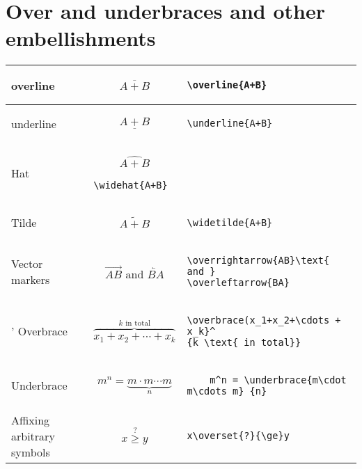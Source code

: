 \section{Over and underbraces and other embellishments}
\begin{longtable}{p{3cm} |p{5cm}| p{5cm}}\hline
    overline & 
\[
    \overline{A+B}
\]
&
\begin{verbatim}
\overline{A+B}
\end{verbatim} \\\hline
underline &
\[
\underline{A+B}
\] &
\begin{verbatim}
\underline{A+B}
\end{verbatim}
\\\hline
Hat &
\[
    \widehat{A+B}
\]
\begin{verbatim}
\widehat{A+B}
\end{verbatim}
\\\hline
Tilde&
\[
    \widetilde{A+B}
\]
&
\begin{verbatim}
\widetilde{A+B}
\end{verbatim}\\\hline
Vector markers &
\[
\overrightarrow{AB}\text{ and }
\overleftarrow{BA}
\] &
\begin{verbatim}
\overrightarrow{AB}\text{ and }
\overleftarrow{BA}
\end{verbatim}\\\hline'
Overbrace &
\[
\overbrace{x_1+x_2+\cdots + x_k}^
{k \text{ in total}}
\] &
\begin{verbatim}
\overbrace(x_1+x_2+\cdots + x_k}^
{k \text{ in total}}
\end{verbatim}
\\\hline
Underbrace &
\[
    m^n = \underbrace{m\cdot m\cdots m}_{n}
\] &
\begin{verbatim}
    m^n = \underbrace{m\cdot m\cdots m}_{n}
\end{verbatim}\\\hline
Affixing arbitrary symbols &
\[
x\overset{?}{\ge}y
\]
&
\begin{verbatim}
x\overset{?}{\ge}y
\end{verbatim}
\end{longtable}
